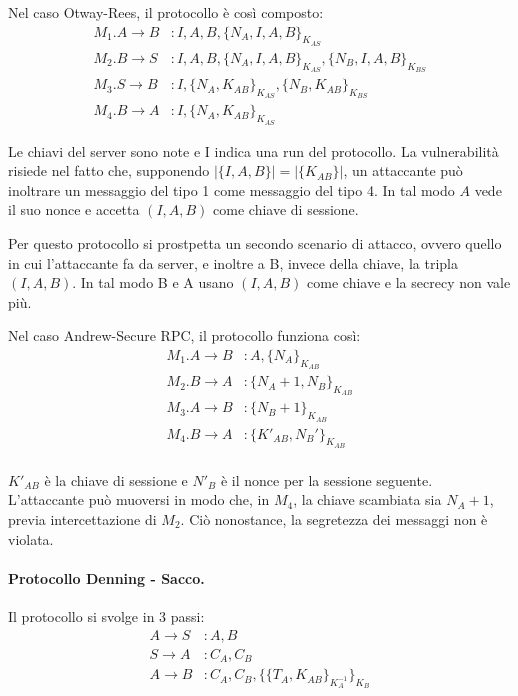 \documentclass[a4paper, 10pt, twoside]{article}
\begin{document}
	Nel caso Otway-Rees, il protocollo è così composto: \begin{align*}
		M_1. A \to B&: I,A,B, \lbrace N_A, I, A, B\rbrace_{K_{AS}} \\
		M_2. B \to S&: I,A,B, \lbrace N_A, I, A, B\rbrace_{K_{AS}}, \lbrace N_B, I, A, B\rbrace_{K_{BS}} \\
		M_3. S \to B&: I, \lbrace N_A, K_{AB}\rbrace_{K_{AS}}, \lbrace N_B, K_{AB}\rbrace_{K_{BS}}\\
		M_4. B \to A&: I, \lbrace N_A, K_{AB}\rbrace_{K_{AS}}
	\end{align*}

	Le chiavi del server sono note e I indica una run del protocollo.
	La vulnerabilità risiede nel fatto che, supponendo $\vert \lbrace I,A,B\rbrace\vert = \vert\lbrace K_{AB} \rbrace\vert$, un attaccante può inoltrare un messaggio del tipo 1 come messaggio del tipo 4. In tal modo $A$ vede il suo nonce e accetta $(I, A, B)$ come chiave di sessione.

	Per questo protocollo si prostpetta un secondo scenario di attacco, ovvero quello in cui l'attaccante fa da server, e inoltre a B, invece della chiave, la tripla $(I, A, B)$. In tal modo B e A usano $(I, A, B)$ come chiave e la secrecy non vale più.
	
	Nel caso Andrew-Secure RPC, il protocollo funziona così: \begin{align*}
		M_1. A \to B&: A, \lbrace N_A\rbrace_{K_{AB}}\\
		M_2. B \to A&: \lbrace N_A +1, N_B\rbrace_{K_{AB}}\\
		M_3. A \to B&: \lbrace N_B + 1\rbrace_{K_{AB}}\\
		M_4. B \to A&: \lbrace K'_{AB}, N_B'\rbrace_{K_{AB}}\\
	\end{align*}

	$K'_{AB}$ è la chiave di sessione e $N'_B$ è il nonce per la sessione seguente. L'attaccante può muoversi in modo che, in $M_4$, la chiave scambiata sia $N_A + 1$, previa intercettazione di $M_2$. Ciò nonostance, la segretezza dei messaggi non è violata.

	\paragraph{Protocollo Denning - Sacco.}
	Il protocollo si svolge in 3 passi: \begin{align*}
		A\to S&: A, B \\
		S\to A&: C_A, C_B \\
		A \to B&: C_A, C_B, \lbrace\lbrace T_A, K_{AB}\rbrace_{K_A^{-1}}\rbrace_{K_B}
	\end{align*}
\end{document}
